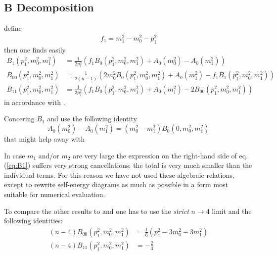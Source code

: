 \subsection{B Decomposition}
define
\begin{align}
f_1 = m_1^2-m_0^2-p_1^2
\end{align}
then one finds easily
\begin{align}
B_1(p_1^2,m_0^2,m_1^2) &= \frac 1 {2p_1^2}\left(f_1B_0(p_1^2,m_0^2,m_1^2)+A_0(m_0^2)-A_0(m_1^2)\right) \label{eq:B1}\\
B_{00}(p_1^2,m_0^2,m_1^2) &= \frac 1 {2(n-1)}\left(2m_0^2B_0(p_1^2,m_0^2,m_1^2)+A_0(m_1^2)-f_1B_1(p_1^2,m_0^2,m_1^2)\right)\\
B_{11}(p_1^2,m_0^2,m_1^2) &= \frac 1 {2p_1^2}\left(f_1B_0(p_1^2,m_0^2,m_1^2)+A_0(m_1^2)-2B_{00}(p_1^2,m_0^2,m_1^2)\right)
\end{align}
in accordance with \cite{Bojak:2000eu,Ellis:2011cr}.

Concering $B_1$ \cite{Passarino:1978jh} and \LoopTools{} use the following identity
\begin{equation}
A_0(m_0^2)-A_0(m_1^2)=(m_0^2-m_1^2)B_0(0,m_0^2,m_1^2)
\end{equation}
that might help away with
\begin{displayquote}
In case $m_1$ and/or $m_2$ are very large the expression on the right-hand side of eq. (\ref{eq:B1}) suffers very strong cancellations: the total is very much smaller than the individual terms. For this reason we have not used these algebraic relations, except to rewrite self-energy diagrams as much as possible in a form most suitable for numerical evaluation.
\end{displayquote}

To compare the other results to \cite{Passarino:1978jh} and \LoopTools{} one has to use the \textit{strict} $n\rightarrow 4$ limit and the following identities\cite{Denner:2005nn}:
\begin{align}
(n-4) B_{00}(p_1^2,m_0^2,m_1^2) &= \frac 1 6 (p_1^2-3m_0^2-3m_1^2)\\
(n-4) B_{11}(p_1^2,m_0^2,m_1^2) &= -\frac 2 3
\end{align}

